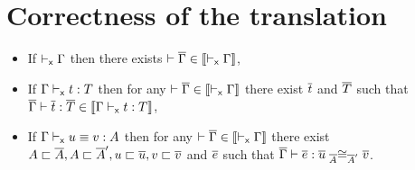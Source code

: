 \section{Correctness of the translation}
\label{sec:corr-transl}
\begin{theorem}[Translation]
  \leavevmode
  \begin{itemize}
    \item If $\xisctx{\Ga}$ then there exists
    $\isctx{\Gb} \in \trans{\xisctx{\Ga}}$,

    \item If $\xisterm{\Ga}{t}{T}$ then for any
    $\isctx{\Gb} \in \trans{\xisctx{\Ga}}$ there exist $\tb$ and $\Tb$ such that
    $\isterm{\Gb}{\tb}{\Tb} \in \trans{\xisterm{\Ga}{t}{T}}$,

    \item If $\xeqterm{\Ga}{u}{v}{A}$ then for any
    $\isctx{\Gb} \in \trans{\xisctx{\Ga}}$ there exist
    $A \ir \Ab, A \ir \Ab', u \ir \ub, v \ir \vb$ and $\eb$ such that
    $\isterm{\Gb}{\eb}{\Heq{\Ab}{\ub}{\Ab'}{\vb}}$.
  \end{itemize}
\end{theorem}

